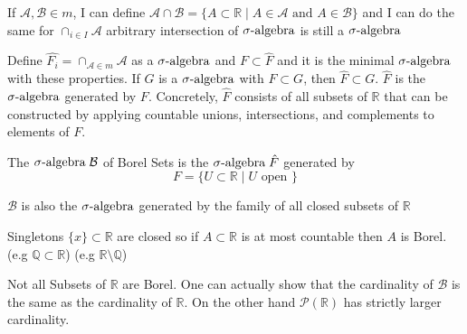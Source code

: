If $\mathcal{A}, \mathcal{B} \in m$, I can define $\mathcal{A} \cap \mathcal{B} = \{ A \subset \mathbb{R} \mid A \in \mathcal{A} \text{ and } A \in \mathcal{B} \}$ and I can do the same for $\cap_{i \in I} \mathcal{A}$ arbitrary intersection of $\sigma\text{-algebra}$ is still a $\sigma\text{-algebra}$

Define $\hat{F_i} = \cap_{\mathcal{A} \in m} \mathcal{A}$ as a $\sigma\text{-algebra}$ and $F \subset \hat{F}$ and it is the minimal $\sigma\text{-algebra}$ with these properties.
If $G$ is a $\sigma\text{-algebra}$ with $F \subset G$, then $\hat{F} \subset G$.
$\hat{F}$ is the $\sigma\text{-algebra}$ generated by $F$.
Concretely, $\hat{F}$ consists of all subsets of $\mathbb{R}$ that can be constructed by applying countable unions, intersections, and complements to elements of $F$.

\begin{definition}
    The $\sigma\text{-algebra} \; \mathcal{B}$ of Borel Sets is the $\sigma\text{-algebra} \; \hat{F}$ generated by
    \[
        F = \{ U \subset \mathbb{R} \mid U \text{ open } \}
    \]
\end{definition}

\begin{remark}
    $\mathcal{B}$ is also the $\sigma\text{-algebra}$ generated by the family of all closed subsets of $\mathbb{R}$
\end{remark}

Singletons $\{ x \} \subset \mathbb{R}$ are closed so if $A \subset \mathbb{R}$ is at most countable then $A$ is Borel.
(e.g $\mathbb{Q} \subset \mathbb{R}$) (e.g $\mathbb{R} \setminus \mathbb{Q}$)

Not all Subsets of $\mathbb{R}$ are Borel.
One can actually show that the cardinality of $\mathcal{B}$ is the same as the cardinality of $\mathbb{R}$.
On the other hand $\mathcal{P}(\mathbb{R})$ has strictly larger cardinality.